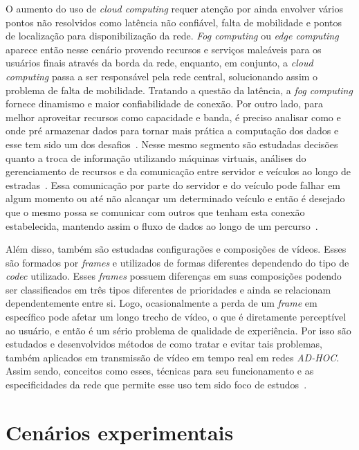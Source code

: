 \documentclass[12pt]{article}
\begin{document}
    O aumento do uso de \textit{cloud computing} requer atenção por ainda envolver vários pontos não resolvidos como latência não confiável, falta de mobilidade e pontos de localização para disponibilização da rede. \textit{Fog computing} ou \textit{edge computing} aparece então nesse cenário provendo recursos e serviços maleáveis para os usuários finais através da borda da rede, enquanto, em conjunto, a \textit{cloud computing} passa a ser responsável pela rede central, solucionando assim o problema de falta de mobilidade. Tratando a questão da latência, a \textit{fog computing} fornece dinamismo e maior confiabilidade de conexão. Por outro lado, para melhor aproveitar recursos como capacidade e banda, é preciso analisar como e onde pré armazenar dados para tornar mais prática a computação dos dados e esse tem sido um dos desafios~\cite{Yi:2015:SFC:2757384.2757397}. Nesse mesmo segmento são estudadas decisões quanto a troca de informação utilizando máquinas virtuais, análises do gerenciamento de recursos e da comunicação entre servidor e veículos ao longo de estradas~\cite{Yao:2015:MEV:2915680.2915702}. Essa comunicação por parte do servidor e do veículo pode falhar em algum momento ou até não alcançar um determinado veículo e então é desejado que o mesmo possa se comunicar com outros que tenham esta conexão estabelecida, mantendo assim o fluxo de dados ao longo de um percurso~\cite{Simula.simula.2416}.
    
    Além disso, também são estudadas configurações e composições de vídeos. Esses são formados por \textit{frames} e utilizados de formas diferentes dependendo do tipo de \textit{codec} utilizado. Esses \textit{frames} possuem diferenças em suas composições podendo ser classificados em três tipos diferentes de prioridades e ainda se relacionam dependentemente entre si. Logo, ocasionalmente a perda de um \textit{frame} em específico pode afetar um longo trecho de vídeo, o que é diretamente perceptível ao usuário, e então é um sério problema de qualidade de experiência. Por isso são estudados e desenvolvidos métodos de como tratar e evitar tais problemas, também aplicados em transmissão de vídeo em tempo real em redes \textit{AD-HOC}. Assim sendo, conceitos como esses, técnicas para seu funcionamento e as especificidades da rede que permite esse uso tem sido foco de estudos~\cite{Immich2018}.
    
\section{Cenários experimentais} \label{sec:cenariosexp}
\end{document}
